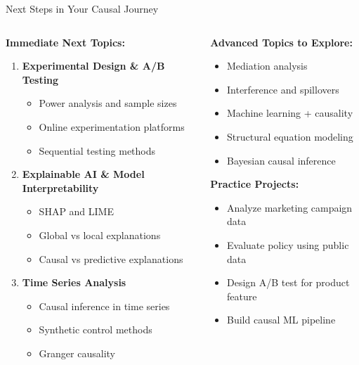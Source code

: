 \documentclass[aspectratio=169,11pt]{beamer}
\begin{document}
\begin{frame}{Next Steps in Your Causal Journey}
\begin{columns}
\begin{column}{0.5\textwidth}
\textbf{Immediate Next Topics:}
\begin{enumerate}
\item \textbf{Experimental Design \& A/B Testing}
   \begin{itemize}
   \item Power analysis and sample sizes
   \item Online experimentation platforms
   \item Sequential testing methods
   \end{itemize}

\item \textbf{Explainable AI \& Model Interpretability}
   \begin{itemize}
   \item SHAP and LIME
   \item Global vs local explanations
   \item Causal vs predictive explanations
   \end{itemize}

\item \textbf{Time Series Analysis}
   \begin{itemize}
   \item Causal inference in time series
   \item Synthetic control methods
   \item Granger causality
   \end{itemize}
\end{enumerate}
\end{column}
\begin{column}{0.5\textwidth}
\textbf{Advanced Topics to Explore:}
\begin{itemize}
\item Mediation analysis
\item Interference and spillovers
\item Machine learning + causality
\item Structural equation modeling
\item Bayesian causal inference
\end{itemize}

\vspace{0.3cm}
\textbf{Practice Projects:}
\begin{itemize}
\item Analyze marketing campaign data
\item Evaluate policy using public data
\item Design A/B test for product feature
\item Build causal ML pipeline
\end{itemize}


\end{column}
\end{columns}
\end{frame}
\end{document}
